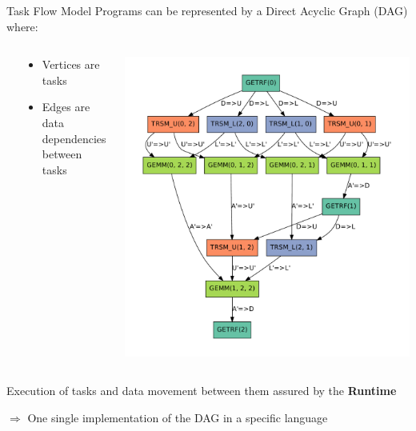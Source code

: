 \begin{frame}{Task Flow Model}
Programs can be represented by a Direct Acyclic Graph (DAG) where:
\begin{columns}
\begin{column}{0.02\textwidth}
\end{column}
\begin{column}{0.45\textwidth}
\begin{itemize}
\item Vertices are tasks
\item Edges are data dependencies between tasks
\end{itemize}
\end{column}
\begin{column}{0.45\textwidth}
\includegraphics[width=0.7\linewidth]{getrf}
\end{column}
\end{columns}
\begin{flushleft}
Execution of tasks and data movement between them assured by the \textbf{Runtime}
\end{flushleft}
\begin{flushleft}
$\Rightarrow$ One single implementation of the DAG in a specific language
\end{flushleft}
\end{frame}

